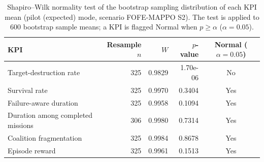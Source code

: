 \begin{table}[htbp]
  \centering
  \caption{Shapiro--Wilk normality test of the bootstrap sampling distribution of each KPI mean (pilot (expected) mode, scenario FOFE-MAPPO S2). The test is applied to 600 bootstrap sample means; a KPI is flagged Normal when $p \geq \alpha$ ($\alpha=0.05$).}
  \label{tab:normality_FOFE_MAPPO_S2_pilot}
  \begin{tabular}{lrrrc}
    \toprule
    KPI & Resample $n$ & $W$ & $p$-value & Normal ($\alpha=0.05$) \\
    \midrule
    Target-destruction rate & 325 & 0.9829 & 1.70e-06 & No \\
    Survival rate & 325 & 0.9970 & 0.3404 & Yes \\
    Failure-aware duration & 325 & 0.9958 & 0.1094 & Yes \\
    Duration among completed missions & 306 & 0.9980 & 0.7314 & Yes \\
    Coalition fragmentation & 325 & 0.9984 & 0.8678 & Yes \\
    Episode reward & 325 & 0.9961 & 0.1513 & Yes \\
    \bottomrule
  \end{tabular}
\end{table}
